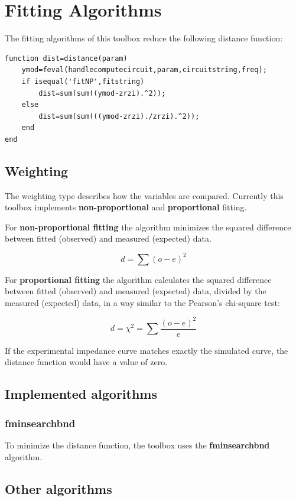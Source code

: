 \documentclass[10pt,a4paper,oneside]{book}
\begin{document}
\chapter{Fitting Algorithms}




The fitting algorithms of this toolbox reduce the following distance function:

\begin{verbatim}
function dist=distance(param)
    ymod=feval(handlecomputecircuit,param,circuitstring,freq);
    if isequal('fitNP',fitstring)
        dist=sum(sum((ymod-zrzi).^2));
    else
        dist=sum(sum(((ymod-zrzi)./zrzi).^2));  
    end
end
\end{verbatim}

\section{Weighting}

The weighting type describes how the variables are compared. Currently this toolbox implements \textbf{non-proportional} and \textbf{proportional} fitting.

For \textbf{non-proportional fitting} the algorithm minimizes the squared difference between fitted (observed) and measured (expected) data.

\[ d = \sum(o-e)^2 \]

For \textbf{proportional fitting} the algorithm calculates the squared difference between fitted (observed) and measured (expected) data, divided by the measured (expected) data, in a way similar to the Pearson's chi-square test:

\[ d = \chi^2 = \sum \dfrac{(o-e)^2}{e} \]

If the experimental impedance curve matches exactly the simulated curve, the distance function would have a value of zero.

\section{Implemented algorithms}

\subsection{fminsearchbnd}

To minimize the distance function, the toolbox uses the \textbf{fminsearchbnd} algorithm.


\section{Other algorithms}
\end{document}
